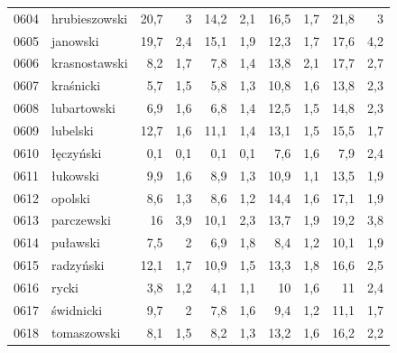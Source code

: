 \begin{center}
\begin{longtable}{lp{3cm}rrrrrrrr}
0604 & hrubieszowski           & 20,7    & 3           & 14,2     & 2,1          & 16,5     & 1,7          & 21,8     & 3            \\
0605 & janowski                & 19,7    & 2,4         & 15,1     & 1,9          & 12,3     & 1,7          & 17,6     & 4,2          \\
0606 & krasnostawski           & 8,2     & 1,7         & 7,8      & 1,4          & 13,8     & 2,1          & 17,7     & 2,7          \\
0607 & kraśnicki               & 5,7     & 1,5         & 5,8      & 1,3          & 10,8     & 1,6          & 13,8     & 2,3          \\
0608 & lubartowski             & 6,9     & 1,6         & 6,8      & 1,4          & 12,5     & 1,5          & 14,8     & 2,3          \\
0609 & lubelski                & 12,7    & 1,6         & 11,1     & 1,4          & 13,1     & 1,5          & 15,5     & 1,7          \\
0610 & łęczyński               & 0,1     & 0,1         & 0,1      & 0,1          & 7,6      & 1,6          & 7,9      & 2,4          \\
0611 & łukowski                & 9,9     & 1,6         & 8,9      & 1,3          & 10,9     & 1,1          & 13,5     & 1,9          \\
0612 & opolski                 & 8,6     & 1,3         & 8,6      & 1,2          & 14,4     & 1,6          & 17,1     & 1,9          \\
0613 & parczewski              & 16      & 3,9         & 10,1     & 2,3          & 13,7     & 1,9          & 19,2     & 3,8          \\
0614 & puławski                & 7,5     & 2           & 6,9      & 1,8          & 8,4      & 1,2          & 10,1     & 1,9          \\
0615 & radzyński               & 12,1    & 1,7         & 10,9     & 1,5          & 13,3     & 1,8          & 16,6     & 2,5          \\
0616 & rycki                   & 3,8     & 1,2         & 4,1      & 1,1          & 10       & 1,6          & 11       & 2,4          \\
0617 & świdnicki               & 9,7     & 2           & 7,8      & 1,6          & 9,4      & 1,2          & 11,1     & 1,7          \\
0618 & tomaszowski             & 8,1     & 1,5         & 8,2      & 1,3          & 13,2     & 1,6          & 16,2     & 2,2          \\

\end{longtable}
\end{center}
